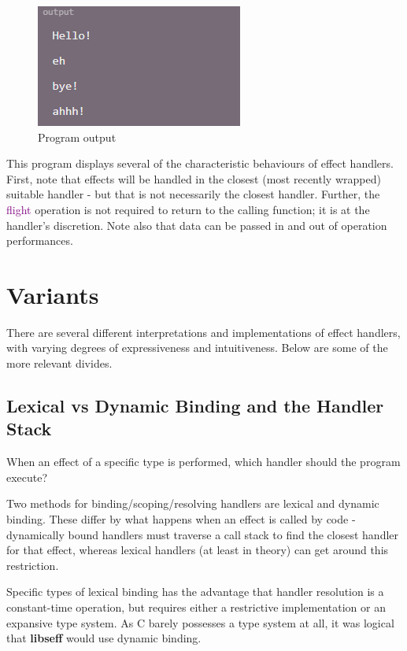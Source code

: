 \documentclass[logo,bsc,singlespacing,parskip,online]{infthesis}
\begin{document}
\begin{figure}[ht]
    \centering
    \includegraphics[width=0.5\linewidth]{effekt_2_out.png}
    \caption{Program output}
\end{figure}

This program displays several of the characteristic behaviours of effect handlers. First, note that effects will be handled in the closest (most recently wrapped) suitable handler - but that is not necessarily the closest handler. Further, the \textcolor{purple}{flight} operation is not required to return to the calling function; it is at the handler's discretion. Note also that data can be passed in and out of operation performances.


\section{Variants}
There are several different interpretations and implementations of effect handlers, with varying degrees of expressiveness and intuitiveness. Below are some of the more relevant divides.

\subsection{Lexical vs Dynamic Binding and the Handler Stack}

When an effect of a specific type is performed, which handler should the program execute? 

Two methods for binding/scoping/resolving handlers are lexical and dynamic binding.\citep{lexical} These differ by what happens when an effect is called by code - dynamically bound handlers must traverse a call stack to find the closest handler for that effect, whereas lexical handlers (at least in theory) can get around this restriction.

Specific types of lexical binding has the advantage that handler resolution is a constant-time operation, but requires either a restrictive implementation or an expansive type system. As C barely possesses a type system at all, it was logical that \textbf{libseff} would use dynamic binding.
\end{document}
